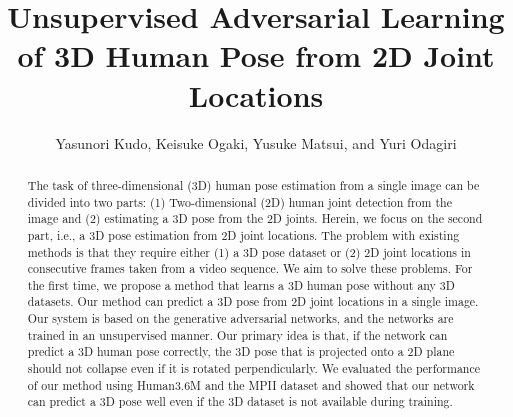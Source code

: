 \documentclass[runningheads]{llncs}
\begin{document}
\pagestyle{headings}
\mainmatter
\def\ECCV18SubNumber{1654}  %

\title{Unsupervised Adversarial Learning of 3D Human Pose from 2D Joint Locations} %



\author{
Yasunori Kudo, Keisuke Ogaki, Yusuke Matsui, and Yuri Odagiri
}


\maketitle

\begin{abstract}
The task of three-dimensional (3D) human pose estimation from a single image can be divided into two parts: (1) Two-dimensional (2D) human joint detection from the image and (2) estimating a 3D pose from the 2D joints.
Herein, we focus on the second part, i.e., a 3D pose estimation from 2D joint locations.
The problem with existing methods is that they require either (1) a 3D pose dataset or (2) 2D joint locations in consecutive frames taken from a video sequence.
We aim to solve these problems.
For the first time, we propose a method that learns a 3D human pose without any 3D datasets.
Our method can predict a 3D pose from 2D joint locations in a single image.
Our system is based on the generative adversarial networks, and the networks are trained in an unsupervised manner.
Our primary idea is that, if the network can predict a 3D human pose correctly, the 3D pose that is projected onto a 2D plane should not collapse even if it is rotated perpendicularly.
We evaluated the performance of our method using Human3.6M and the MPII dataset and showed that our network can predict a 3D pose well even if the 3D dataset is not available during training.
\end{abstract}
\end{document}
